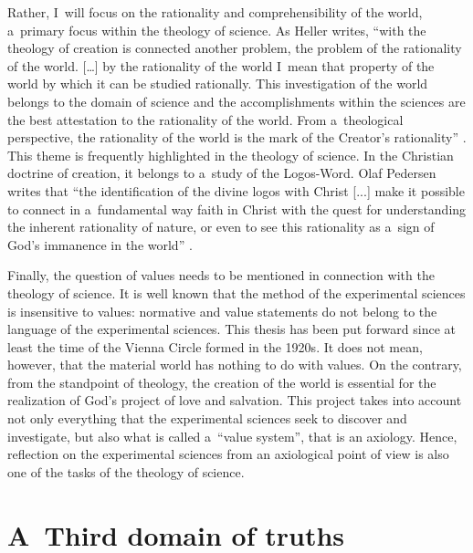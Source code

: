 Rather, I~will focus on the rationality and comprehensibility of the world, a~primary focus within the theology of science. As Heller writes, ``with the theology of creation is connected another problem, the problem of the rationality of the world. […] by the rationality of the world I~mean that property of the world by which it can be studied rationally. This investigation of the world belongs to the domain of science and the accomplishments within the sciences are the best attestation to the rationality of the world. From a~theological perspective, the rationality of the world is the mark of the Creator's rationality'' 
\parencite[][p.21]{maczka_wstep_2015}. %
 This theme is frequently highlighted in the theology of science. In the Christian doctrine of creation, it belongs to a~study of the Logos{}-Word. Olaf Pedersen writes that ``the identification of the divine logos with Christ [...] make it possible to connect in a~fundamental way faith in Christ with the quest for understanding the inherent rationality of nature, or even to see this rationality as a~sign of God's immanence in the world'' 
\parencite[][p.147]{pedersen_historical_1990}.%




Finally, the question of values needs to be mentioned in connection with the theology of science. It is well known that the method of the experimental sciences is insensitive to values: normative and value statements do not belong to the language of the experimental sciences. This thesis has been put forward since at least the time of the Vienna Circle formed in the 1920s. It does not mean, however, that the material world has nothing to do with values. On the contrary, from the standpoint of theology, the creation of the world is essential for the realization of God's project of love and salvation. This project takes into account not only everything that the experimental sciences seek to discover and investigate, but also what is called a~``value system'', that is an axiology. Hence, reflection on the experimental sciences from an axiological point of view is also one of the tasks of the theology of science.



\section{A~Third domain of truths }

